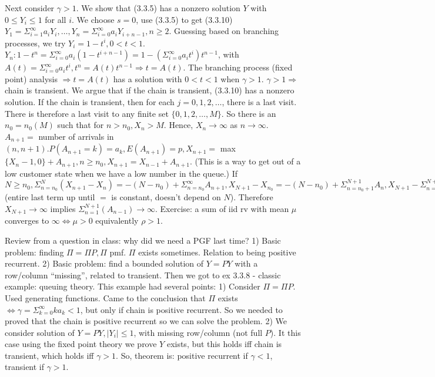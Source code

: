 \documentclass{article}
\begin{document}
Next consider $\gamma > 1$. We show that (3.3.5) has a nonzero solution $Y$ with $0 \le Y_i \le 1$ for all $i$. We choose $s = 0$, use (3.3.5) to get (3.3.10) $Y_1 = \Sigma_{i=1}^\infty a_i Y_i, \dots, Y_n = \Sigma_{i=0}^\infty a_i Y_{i+n-1}, n \ge 2$. Guessing based on branching processes, we try $Y_i = 1-t^i, 0 < t < 1$. $Y_n: 1-t^n = \Sigma_{i=0}^\infty a_i (1-t^{i+n-1}) = 1 - (\Sigma_{i=0}^\infty a_i t^i) t^{n-1}$, with $A(t) = \Sigma_{i=0}^\infty a_i t^i, t^n = A(t) t^{n-1} \Rightarrow t = A(t)$. The branching process (fixed point) analysis $\Rightarrow t = A(t)$ has a solution with $0 < t < 1$ when $\gamma > 1$. $\gamma > 1 \Rightarrow$ chain is transient. We argue that if the chain is transient, (3.3.10) has a nonzero solution. If the chain is transient, then for each $j = 0, 1, 2, \dots$, there is a last visit. There is therefore a last visit to any finite set $\{0, 1, 2, \dots, M\}$. So there is an $n_0 = n_0(M)$ such that for $n > n_0, X_n > M$. Hence, $X_n \rightarrow \infty$ as $n \rightarrow \infty$. $A_{n+1} =$ number of arrivals in $(n, n+1). P(A_{n+1} = k) = a_k, E(A_{n+1}) = p, X_{n+1} =$ max$\{ X_n - 1, 0\} + A_{n+1}, n \ge n_0, X_{n+1} = X_{n-1} + A_{n+1}$. (This is a way to get out of a low customer state when we have a low number in the queue.) If $N \ge n_0, \Sigma_{n=n_0}^N (X_{n+1} - X_n) = -(N - n_0) + \Sigma_{n=n_0}^\infty A_{n+1}, X_{N+1} - X_{n_0} = -(N - n_0) + \Sigma_{n = n_0 + 1}^{N+1} A_n, X_{N+1} - \Sigma_{n=1}^{N+1} (A_{n-1}) = X_{n_0} + n_0 - \Sigma_{n=1}^{n_0} A_n$ (entire last term up until $=$ is constant, doesn't depend on $N$). Therefore $X_{N+1} \rightarrow \infty$ implies $\Sigma_{n=1}^{N+1} (A_{n-1}) \rightarrow \infty$. Exercise: a sum of iid rv with mean $\mu$ converges to $\infty \iff \mu > 0$ equivalently $\rho > 1$.

Review from a question in class: why did we need a PGF last time? 1) Basic problem: finding $\Pi = \Pi P, \Pi$ pmf. $\Pi$ exists sometimes. Relation to being positive recurrent.  2) Basic problem: find a bounded solution of $Y = PY$ with a row/column ``missing'', related to transient. Then we got to ex 3.3.8 - classic example: queuing theory. This example had several points: 1) Consider $\Pi = \Pi P$. Used generating functions. Came to the conclusion that $\Pi$ exists $\iff \gamma = \Sigma_{k=0}^\infty k a_k < 1$, but only if chain is positive recurrent. So we needed to proved that the chain is positive recurrent so we can solve the problem. 2) We consider solution of $Y = PY, |Y_i| \le 1$, with missing row/column (not full $P$). It this case using the fixed point theory we prove $Y$ exists, but this holds iff chain is transient, which holds iff $\gamma > 1$. So, theorem is: positive recurrent if $\gamma < 1$, transient if $\gamma > 1$.
\end{document}
